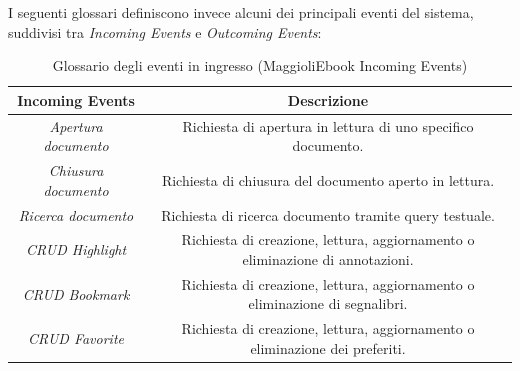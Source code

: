I seguenti glossari definiscono invece alcuni dei principali eventi del sistema, suddivisi tra \textit{Incoming Events} e \textit{Outcoming Events}:

\begin{table}[H]
\centering
    \begin{tabular}{|c|c|}
         \hline
         \textbf{Incoming Events} & \textbf{Descrizione}\\
         \hline
         \textit{Apertura documento} & Richiesta di apertura in lettura di uno specifico documento.\\
         \hline
         \textit{Chiusura documento} & Richiesta di chiusura del documento aperto in lettura.\\
         \hline
         \textit{Ricerca documento} & Richiesta di ricerca documento tramite query testuale.\\
         \hline
         \textit{CRUD Highlight} & \specialcell{Richiesta di creazione, lettura, aggiornamento o \\eliminazione di annotazioni.}\\
         \hline
         \textit{CRUD Bookmark} & \specialcell{Richiesta di creazione, lettura, aggiornamento o \\eliminazione di segnalibri.}\\
         \hline
          \textit{CRUD Favorite} & \specialcell{Richiesta di creazione, lettura, aggiornamento o \\eliminazione dei preferiti.}\\
         \hline
    \end{tabular}
    \caption{Glossario degli eventi in ingresso (MaggioliEbook Incoming Events)}
\end{table}


